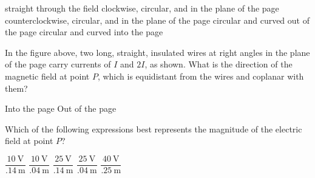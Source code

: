 \documentclass[12pt]{../../oss-apphys-exam}
\begin{document}
\begin{questions}
  \vspace{.1in}
  \begin{minipage}{.4\linewidth}
  \end{minipage}
  \begin{minipage}{.55\linewidth}
    \begin{choices}
      \choice straight through the field
      \choice clockwise, circular, and in the plane of the page
      \choice counterclockwise, circular, and in the plane of the page
      \choice circular and curved out of the page
      \choice circular and curved into the page
    \end{choices}
  \end{minipage}
  \newpage
  
  \question In the figure above, two long, straight, insulated wires at right
  angles in the plane of the page carry currents of $I$ and $2I$, as shown.
  What is the direction of the magnetic field at point $P$, which is
  equidistant from the wires and coplanar with them?
  \begin{choices}
    \choice Into the page
    \choice Out of the page
    \choice {\huge$\searrow$}
    \choice {\huge$\nwarrow$}
    \choice {\huge$\nearrow$}
  \end{choices}
  \newpage
  
  
  \question Which of the following expressions best represents the magnitude of
  the electric field at point $P$?
  \label{contour1}
  \begin{choices}
    \choice $\dfrac{\SI{10}\volt}{\SI{.14}\metre}$
    \choice $\dfrac{\SI{10}\volt}{\SI{.04}\metre}$
    \choice $\dfrac{\SI{25}\volt}{\SI{.14}\metre}$
    \choice $\dfrac{\SI{25}\volt}{\SI{.04}\metre}$
    \choice $\dfrac{\SI{40}\volt}{\SI{.25}\metre}$
  \end{choices}


\end{questions}
\end{document}
